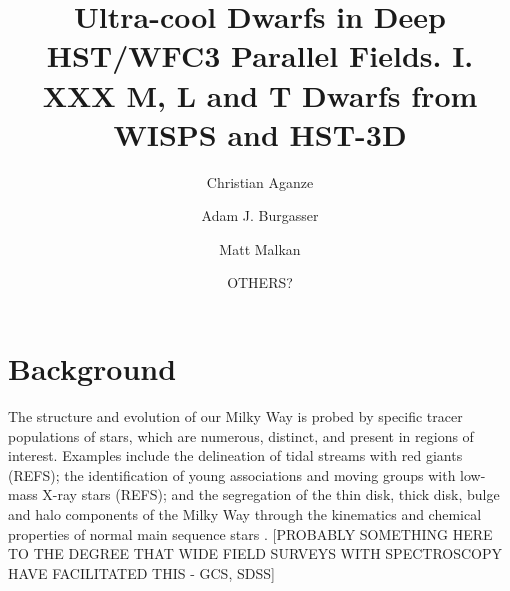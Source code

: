 \documentclass[manuscript]{aastex}
\begin{document}
\newcommand{\meth}{CH$_4 $ }
\newcommand{\wat}{H$_2$O }
\newcommand{\teff}{T$_{eff}$ }
\newcommand{\Msun}{M$_\sun$}
\newcommand{\figfolder}{/Users/caganze/research/wisps/figures/}

\title{Ultra-cool Dwarfs in Deep HST/WFC3 Parallel Fields. I. XXX M, L and T Dwarfs from WISPS and HST-3D}
\author{Christian Aganze}
\author{Adam J. Burgasser }
\author{Matt Malkan}
\author{OTHERS?}

\begin{abstract}
\end{abstract}

\section{Background}

The structure and evolution of our Milky Way is probed by specific tracer populations of stars,
which are numerous, distinct, and present in regions of interest. Examples include the delineation of tidal streams with red giants (REFS); the identification of young associations and moving groups with low-mass X-ray stars (REFS); and the segregation of the thin disk, thick disk, bulge and halo components of the Milky Way through the kinematics and chemical properties of normal main sequence stars \citep[NEED MORE]{1997ApJ...483..103S,Bovy2012}. [PROBABLY SOMETHING HERE TO THE DEGREE THAT WIDE FIELD SURVEYS WITH SPECTROSCOPY HAVE FACILITATED THIS - GCS, SDSS]
\end{document}
